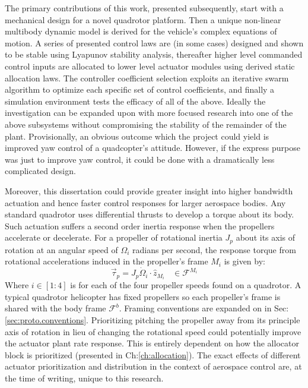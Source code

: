 \par
The primary contributions of this work, presented subsequently, start with a mechanical design for a novel quadrotor platform. Then a unique non-linear multibody dynamic model is derived for the vehicle's complex equations of motion. A series of presented control laws are (in some cases) designed and shown to be stable using Lyapunov stability analysis, thereafter higher level commanded control inputs are allocated to lower level actuator modules using derived static allocation laws. The controller coefficient selection exploits an iterative swarm algorithm to optimize each specific set of control coefficients, and finally a simulation environment tests the efficacy of all of the above. Ideally the investigation can be expanded upon with more focused research into one of the above subsystems without compromising the stability of the remainder of the plant. Provisionally, an obvious outcome which the project could yield is improved yaw control of a quadcopter's attitude. However, if the express purpose was just to improve yaw control, it could be done with a dramatically less complicated design.
\par
Moreover, this dissertation could provide greater insight into higher bandwidth actuation and hence faster control responses for larger aerospace bodies. Any standard quadrotor uses differential thrusts to develop a torque about its body. Such actuation suffers a second order inertia response when the propellers accelerate or decelerate. For a propeller of rotational inertia $J_p$ about its axis of rotation at an angular speed of $\Omega_i$ radians per second, the response torque from rotational accelerations induced in the propeller's frame $M_i$ is given by:
\begin{equation}
\vec{\tau}_{p}=J_p\dot{\Omega}_i\cdot\hat{z}_{M_i}~~~~\in\mathcal{F}^{M_i}
\end{equation}
Where $i\in[1:4]$ is for each of the four propeller speeds found on a quadrotor. A typical quadrotor helicopter has fixed propellers so each propeller's frame is shared with the body frame $\mathcal{F}^{b}$. Framing conventions are expanded on in Sec:\ref{sec:proto.conventions}. Prioritizing pitching the propeller away from its principle axis of rotation in lieu of changing the rotational speed could potentially improve the actuator plant rate response. This is entirely dependent on how the allocator block is prioritized (presented in Ch:\ref{ch:allocation}). The exact effects of different actuator prioritization and distribution in the context of aerospace control are, at the time of writing, unique to this research.
\newpage
